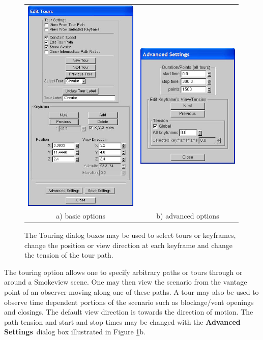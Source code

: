 \documentclass[11pt,twoside]{book}
\newcommand{\figoptions}{hbp}
\begin{document}
\begin{figure}[\figoptions]
\begin{center}
\begin{tabular}{cc}
\includegraphics[width=2.159722in]{figures/figTOUR}&
\includegraphics[width=1.93055in]{figures/figADVANCEDTOUR}\\
a) basic options&b) advanced options\\
\end{tabular}
\end{center}
\caption[Touring dialog boxes.]{The Touring dialog boxes may be
used to select tours or keyframes, change the position or view
direction at each keyframe and change the tension of the tour
path. }
 \label{figTOUR}
\end{figure}

The touring option allows one to specify arbitrary paths or tours
through or around a Smokeview scene.  One may then view the
scenario from the vantage point of an observer moving along one of
these paths.    A tour
may also be used to observe time dependent portions of the
scenario such as blockage/vent openings and closings.  The default
view direction is towards the direction of motion.  The path tension and start and stop times may be changed with the {\bf Advanced
Settings}\ dialog box illustrated in Figure \ref{figTOUR}b.
\end{document}
